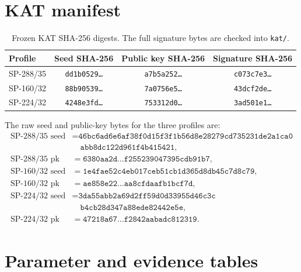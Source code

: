 \documentclass[11pt,a4paper]{article}
\begin{document}
\section{KAT manifest}

\begin{table}[ht]
\centering
\small
\caption{Frozen KAT SHA-256 digests. The full signature bytes are checked into
\texttt{kat/}.}
\label{tab:kat}
\begin{tabular}{@{}lccc@{}}
\toprule
Profile & Seed SHA-256 & Public key SHA-256 & Signature SHA-256 \\
\midrule
SP-288/35 & \texttt{dd1b0529\ldots} & \texttt{a7b5a252\ldots} & \texttt{c073c7e3\ldots} \\
SP-160/32 & \texttt{88b90539\ldots} & \texttt{7a0756e5\ldots} & \texttt{43dcf2de\ldots} \\
SP-224/32 & \texttt{4248e3fd\ldots} & \texttt{753312d0\ldots} & \texttt{3ad501e1\ldots} \\
\bottomrule
\end{tabular}
\end{table}

The raw seed and public-key bytes for the three profiles are:
\begin{align*}
\text{SP-288/35 seed} &= \texttt{46bc6ad6e6af38f0d15f3f1b56d8e28279cd735231de2a1ca0}\\
&\quad\texttt{abb8dc122d961f4b415421},\\
\text{SP-288/35 pk} &= \texttt{6380aa2d\ldots f255239047395cdb91b7},\\
\text{SP-160/32 seed} &= \texttt{1e4fae52c4eb017ceb51cb1d365d8db45c7d8c79},\\
\text{SP-160/32 pk} &= \texttt{ae858e22\ldots aa8cfdaafb1bcf7d},\\
\text{SP-224/32 seed} &= \texttt{3da55abb2a69d2ff59d0d33955d46c3c}\\
&\quad\texttt{b4cb28d347a88ede82442e5e},\\
\text{SP-224/32 pk} &= \texttt{47218a67\ldots f2842aabadc812319}.
\end{align*}

\section{Parameter and evidence tables}
\end{document}
